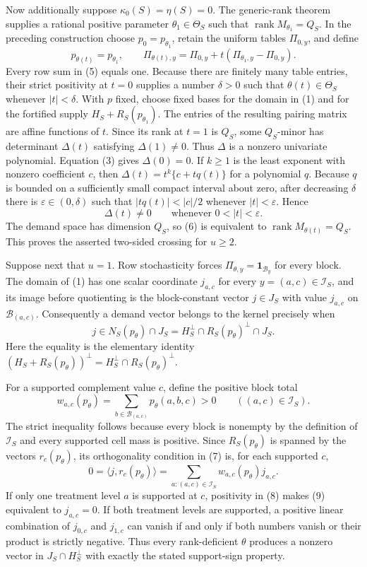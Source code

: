 Now additionally suppose \(\kappa_0(S)=\eta(S)=0\).  The generic-rank theorem supplies a rational positive parameter \(\theta_1\in\Theta_S\) such that \(\operatorname{rank}M_{\theta_1}=Q_S\).  In the preceding construction choose \(p_0=p_{\theta_1}\), retain the uniform tables \(\Pi_{0,y}\), and define
\[
p_{\theta(t)}=p_{\theta_1},
\qquad
\Pi_{\theta(t),y}=\Pi_{0,y}+t(\Pi_{\theta_1,y}-\Pi_{0,y}).
\tag{5}
\]
Every row sum in (5) equals one.  Because there are finitely many table entries, their strict positivity at \(t=0\) supplies a number \(\delta>0\) such that \(\theta(t)\in\Theta_S\) whenever \(|t|<\delta\).  With \(p\) fixed, choose fixed bases for the domain in (1) and for the fortified supply \(H_S+R_S(p_{\theta_1})\).  The entries of the resulting pairing matrix are affine functions of \(t\).  Since its rank at \(t=1\) is \(Q_S\), some \(Q_S\)-minor has determinant \(\Delta(t)\) satisfying \(\Delta(1)\neq0\).  Thus \(\Delta\) is a nonzero univariate polynomial.  Equation (3) gives \(\Delta(0)=0\).  If \(k\geq1\) is the least exponent with nonzero coefficient \(c\), then \(\Delta(t)=t^k\{c+tq(t)\}\) for a polynomial \(q\).  Because \(q\) is bounded on a sufficiently small compact interval about zero, after decreasing \(\delta\) there is \(\varepsilon\in(0,\delta)\) such that \(|tq(t)|<|c|/2\) whenever \(|t|<\varepsilon\).  Hence
\[
\Delta(t)\neq0\qquad\text{whenever }0<|t|<\varepsilon.
\tag{6}
\]
The demand space has dimension \(Q_S\), so (6) is equivalent to \(\operatorname{rank}M_{\theta(t)}=Q_S\).  This proves the asserted two-sided crossing for \(u\geq2\).

Suppose next that \(u=1\).  Row stochasticity forces \(\Pi_{\theta,y}=\mathbf1_{\mathcal B_y}\) for every block.  The domain of (1) has one scalar coordinate \(j_{a,c}\) for every \(y=(a,c)\in\mathcal I_S\), and its image before quotienting is the block-constant vector \(j\in J_S\) with value \(j_{a,c}\) on \(\mathcal B_{(a,c)}\).  Consequently a demand vector belongs to the kernel precisely when
\[
j\in N_S(p_\theta)\cap J_S
=H_S^\perp\cap R_S(p_\theta)^\perp\cap J_S.
\tag{7}
\]
Here the equality is the elementary identity \((H_S+R_S(p_\theta))^\perp=H_S^\perp\cap R_S(p_\theta)^\perp\).

For a supported complement value \(c\), define the positive block total
\[
w_{a,c}(p_\theta)
=\sum_{b\in\mathcal B_{(a,c)}}p_\theta(a,b,c)>0
\qquad ((a,c)\in\mathcal I_S).
\tag{8}
\]
The strict inequality follows because every block is nonempty by the definition of \(\mathcal I_S\) and every supported cell mass is positive.  Since \(R_S(p_\theta)\) is spanned by the vectors \(r_c(p_\theta)\), its orthogonality condition in (7) is, for each supported \(c\),
\[
0=\langle j,r_c(p_\theta)\rangle
=\sum_{a:(a,c)\in\mathcal I_S}w_{a,c}(p_\theta)j_{a,c}.
\tag{9}
\]
If only one treatment level \(a\) is supported at \(c\), positivity in (8) makes (9) equivalent to \(j_{a,c}=0\).  If both treatment levels are supported, a positive linear combination of \(j_{0,c}\) and \(j_{1,c}\) can vanish if and only if both numbers vanish or their product is strictly negative.  Thus every rank-deficient \(\theta\) produces a nonzero vector in \(J_S\cap H_S^\perp\) with exactly the stated support-sign property.

